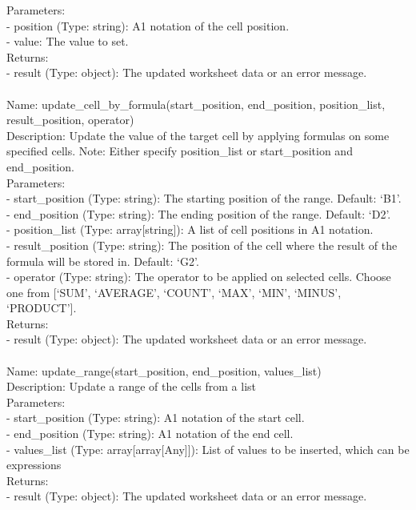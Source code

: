 \begin{tcolorbox}[breakable,title=Prompt Details for Sheet]
Parameters:\\
- position (Type: string): A1 notation of the cell position.\\
- value: The value to set.\\
Returns:\\
- result (Type: object): The updated worksheet data or an error message.\\
\\
Name: update\_cell\_by\_formula(start\_position, end\_position, position\_list, result\_position, operator)\\
Description: Update the value of the target cell by applying formulas on some specified cells. Note: Either specify position\_list or start\_position and end\_position.\\
Parameters:\\
- start\_position (Type: string): The starting position of the range. Default: `B1'.\\
- end\_position (Type: string): The ending position of the range. Default: `D2'.\\
- position\_list (Type: array[string]): A list of cell positions in A1 notation.\\
- result\_position (Type: string): The position of the cell where the result of the formula will be stored in. Default: `G2'.\\
- operator (Type: string): The operator to be applied on selected cells. Choose one from [`SUM', `AVERAGE', `COUNT', `MAX', `MIN', `MINUS', `PRODUCT'].\\
Returns:\\
- result (Type: object): The updated worksheet data or an error message.\\
\\
Name: update\_range(start\_position, end\_position, values\_list)\\
Description: Update a range of the cells from a list\\
Parameters:\\
- start\_position (Type: string): A1 notation of the start cell.\\
- end\_position (Type: string): A1 notation of the end cell.\\
- values\_list (Type: array[array[Any]]): List of values to be inserted, which can be expressions\\
Returns:\\
- result (Type: object): The updated worksheet data or an error message.\\
\\

\end{tcolorbox}
